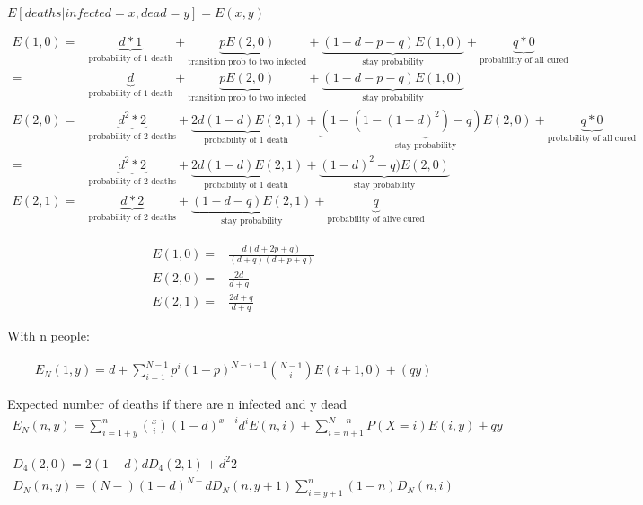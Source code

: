 \documentclass[12pt]{report}
\numberwithin{equation}{section}
\begin{document}
$E[deaths | infected=x, dead = y ] = E(x,y) $


\begin{align*}
E(1,0) = &\underbrace{d*1}_\text{probability of 1 death} + 
    \underbrace{pE(2,0) }_\text{transition prob to two infected} +
    \underbrace{(1-d-p-q)E(1,0)}_\text{stay probability} +
    \underbrace{q*0}_\text{probability of all cured} \\
	= &\underbrace{d}_\text{probability of 1 death}+ 
    \underbrace{pE(2,0) }_\text{transition prob to two infected}+ 
    \underbrace{(1-d-p-q)E(1,0)}_\text{stay probability}  \\
E(2,0) = &\underbrace{d^2* 2}_\text{probability of 2 deaths} + 
    \underbrace{2d(1-d)E(2,1) }_\text{probability of 1 death } +
    \underbrace{(1-(1-(1-d)^2)-q)E(2,0) }_\text{stay probability} +
    \underbrace{q*0}_\text{probability of all cured} \\
	   = &\underbrace{d^2* 2}_\text{probability of 2 deaths} + 
    \underbrace{2d(1-d)E(2,1) }_\text{probability of 1 death } +
    \underbrace{(1-d)^2-q)E(2,0) }_\text{stay probability} \\
E(2,1) = &\underbrace{d*2}_\text{probability of 2 deaths} + 
    \underbrace{(1-d-q)E(2,1) }_\text{stay probability} +
    \underbrace{q}_\text{probability of alive cured}
\end{align*}

\begin{align*}
E(1,0) = & \frac{d(d+2p+q)}{(d+q)(d+p+q)} \\
E(2,0) = & \frac{2d}{d+q} \\
E(2,1) = & \frac{2d+q}{d+q} 
\end{align*}

With n people: 

\begin{align*}
E_N(1,y) = d + \sum_{i=1}^{N-1}p^i(1-p)^{N-i-1}\binom{N-1}{i}E(i+1,0) + (q y)
\end{align*}

Expected number of deaths if there are n infected and y dead
\begin{align*}
E_N(n,y) = \sum_{i = 1+y}^n \binom{x}{i}(1-d)^{x-i}d^i E(n,i) + \sum_{i=n+1}^{N-n} P(X=i)E(i,y) + q y
\end{align*}

\begin{align*}
D_4(2,0) =  2(1-d)d D_4(2,1) + d^2 2  \\
D_N(n,y) = (N-)(1-d)^{N-} d D_N(n,y+1)
\sum_{i=y+1}^n (1-n) D_N(n,i)
\end{align*}
\end{document}
